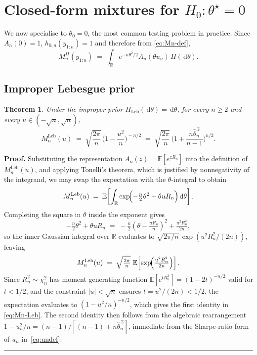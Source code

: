 \documentclass{article}%
\newtheorem{theorem}{Theorem}[section]
\newenvironment{proof}[1][Proof]{\noindent\textbf{#1.} }{\ \rule{0.5em}{0.5em}}
\newcommand{\E}{\mathbb{E}}
\newcommand{\dd}{\,\mathrm{d}}
\newcommand{\Leb}{\mathrm{Leb}}
\newcommand{\1}{\mathbf{1}}
\begin{document}
\section{Closed-form mixtures for $H_0:\theta^\star=0$}\label{sec:closedform}

We now specialise to \(\theta_0=0\), the most common testing problem
in practice. Since \(A_n(0)=1\),
\(h_{0,n}(y_{1:n})=1\) and therefore from \eqref{eq:Mn-def},
\begin{equation}\label{eq:Mn-zero}
   M_n^{\Pi}(y_{1:n})\;=\;\int_\mathbb{R} e^{-n\theta^2/2}A_n(\theta u_n)
                     \,\Pi(\dd\theta).
\end{equation}

\subsection{Improper Lebesgue prior}\label{ssec:Leb}

\begin{theorem}\label{thm:Mn-Leb}
Under the improper prior \(\Pi_{\Leb}(\dd\theta)=\dd\theta\), for
every \(n\geq 2\) and every \(u\in(-\sqrt n,\sqrt n)\),
\begin{equation}\label{eq:Mn-Leb}
  M_n^{\Leb}(u)\;=\;\sqrt{\frac{2\pi}{n}}\,
  \biggl(1-\frac{u^2}{n}\biggr)^{\!-n/2}
  \;=\;\sqrt{\frac{2\pi}{n}}\,
  \biggl(1+\frac{n\widehat\theta_n^{\,2}}{n-1}\biggr)^{\!n/2}.
\end{equation}
\end{theorem}

\begin{proof}
Substituting the representation $A_n(z) = \E[e^{zR_n}]$ into the definition of $M_n^{\Leb}(u)$, and applying Tonelli's theorem, which is justified by nonnegativity of the integrand, we may swap the expectation with the $\theta$-integral to obtain
\[
  M_n^{\Leb}(u) \;=\; \E\!\left[\int_\mathbb{R} \exp\!\Bigl(-\tfrac n2\theta^2 + \theta u R_n\Bigr)\dd\theta\right].
\]
Completing the square in $\theta$ inside the exponent gives
\[
  -\tfrac n2\theta^2 + \theta u R_n
  \;=\; -\tfrac n2\!\left(\theta - \tfrac{u R_n}{n}\right)^{\!2}
  + \tfrac{u^2 R_n^2}{2n},
\]
so the inner Gaussian integral over $\mathbb{R}$ evaluates to
$\sqrt{2\pi/n}\,\exp(u^2 R_n^2/(2n))$, leaving
\[
  M_n^{\Leb}(u)
  \;=\; \sqrt{\tfrac{2\pi}{n}}\;
  \E\!\left[\exp\!\Bigl(\tfrac{u^2 R_n^2}{2n}\Bigr)\right].
\]
Since $R_n^2 \sim \chi_n^2$ has moment generating function
$\E[e^{t R_n^2}] = (1-2t)^{-n/2}$ valid for $t<1/2$, and the constraint
$|u|<\sqrt n$ ensures $t = u^2/(2n) < 1/2$, the expectation evaluates to
$(1 - u^2/n)^{-n/2}$, which gives the first identity in \eqref{eq:Mn-Leb}. The second identity then follows from the algebraic
rearrangement $1 - u_n^2/n = (n-1)/[(n-1) + n\widehat\theta_n^{\,2}]$,
immediate from the Sharpe-ratio form of $u_n$ in~\eqref{eq:undef}.
\end{proof}
\end{document}
